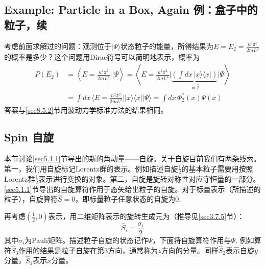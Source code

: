 \subsection[例：盒子中的粒子，续]{Example: Particle in a Box, Again \quad 例：盒子中的粒子，续}
\label{sec8.5.4}
考虑前面求解过的问题：观测位于$|\Psi\rangle$状态粒子的能量，所得结果为$E = E_2 = \frac{n^2 \pi^2}{2mL^2}$的概率是多少？这个问题用Dirac符号可以简明地表示，概率为
\begin{align*}
	P(E_2) &= \left\langle E = \frac{n^2 \pi^2}{2mL^2} \bigg|\bigg| \Psi \right\rangle = \left\langle E = \frac{n^2 \pi^2}{2mL^2} \bigg| \underbrace{ \left( \int dx\, |x\rangle \langle x| \right) }_{= \hat{I}} \bigg| \Psi \right\rangle \\
	&= \int dx\, \langle E = \frac{n^2 \pi^2}{2mL^2} || x \rangle \langle x || \Psi \rangle = \int dx\, \Phi_2^* (x) \Psi(x)
\end{align*}
答案与\ref{sec8.5.2}节用波动力学标准方法的结果相同。


\subsection[自旋]{Spin 自旋}
\label{sec8.5.5}
本节讨论\ref{sec5.1.1}节导出的新的角动量——自旋。关于自旋目前我们有两条线索。第一，我们用自旋标记Lorentz群的表示。例如描述自旋$\frac{1}{2}$的基本粒子需要用按照Lorentz群$\frac{1}{2}$表示进行变换的对象。第二，自旋是旋转对称性对应守恒量的一部分。\ref{sec5.1.1}节导出的自旋算符作用于态矢给出粒子的自旋。对于标量表示（所描述的粒子），自旋算符$\hat{S} = 0$，即标量粒子任意状态的自旋为$0$.

再考虑$(\frac{1}{2}, 0)$表示，用二维矩阵表示的旋转生成元为（推导见\ref{sec3.7.5}节）：
\begin{equation}
\label{equ8.45}
	\hat{S}_i = \frac{\sigma_i}{2}
\end{equation}
其中$\sigma_i$为Pauli矩阵。描述粒子自旋的状态记作$\Psi$，下面将自旋算符作用与$\Psi$. 例如算符$\hat{S}_3$作用的结果是粒子自旋在第$3$方向，通常称为$z$方向的分量。同样$\hat{S}_2$表示自旋$y$分量，$\hat{S}_1$表示$x$分量。


